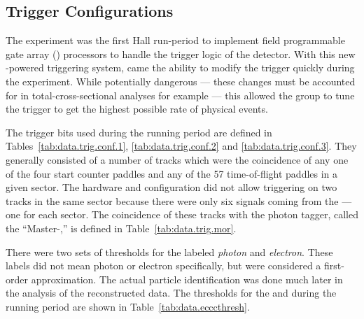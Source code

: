 \subsection{\label{sec:summary.trigger}Trigger Configurations}

The  experiment was the first Hall  run-period to implement field programmable gate array () processors to handle the trigger logic of the  detector. With this new -powered triggering system, came the ability to modify the trigger quickly during the experiment. While potentially dangerous --- these changes must be accounted for in total-cross-sectional analyses for example --- this allowed the group to tune the trigger to get the highest possible rate of physical events.

The trigger bits used during the  running period are defined in Tables~\ref{tab:data.trig.conf.1}, \ref{tab:data.trig.conf.2} and \ref{tab:data.trig.conf.3}. They generally consisted of a number of tracks which were the coincidence of any one of the four start counter paddles and any of the 57 time-of-flight paddles in a given sector. The hardware and configuration did not allow triggering on two tracks in the same sector because there were only six signals coming from the  --- one for each sector. The coincidence of these tracks with the photon tagger, called the ``Master-,'' is defined in Table~\ref{tab:data.trig.mor}.





There were two sets of thresholds for the  labeled \emph{photon} and \emph{electron}. These labels did not mean photon or electron specifically, but were considered a first-order approximation. The actual particle identification was done much later in the analysis of the reconstructed data. The thresholds for the  and  during the  running period are shown in Table~\ref{tab:data.ecccthresh}.


\FloatBarrier
